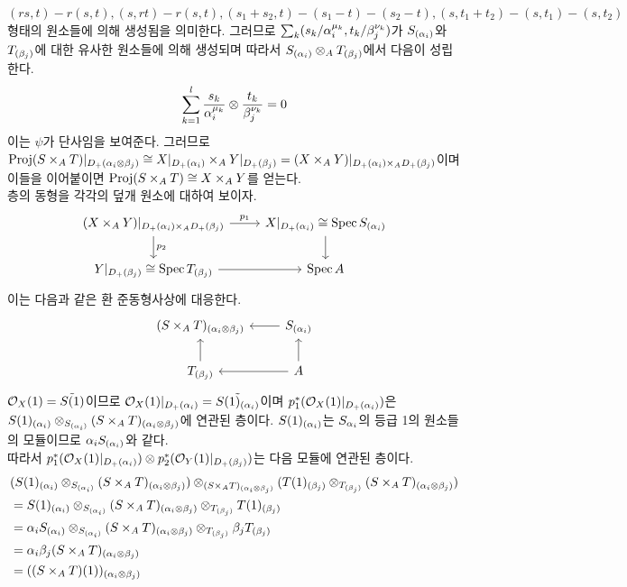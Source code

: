 \begin{enumerate}[label=\tb{5.\arabic*.},itemindent=0mm,itemsep=4mm]
	$(rs,t)-r(s,t),(s,rt)-r(s,t),(s_1+s_2,t)-(s_1-t)-(s_2-t),(s,t_1+t_2)-(s,t_1)-(s,t_2)$ 형태의 원소들에 의해 생성됨을 의미한다.
	그러므로 $\sum_k(s_k/\alpha_i^{\mu_k},t_k/\beta_j^{\nu_k})$가 $S_{(\alpha_i)}$와 $T_{(\beta_j)}$에 대한 유사한 원소들에 의해 생성되며
	따라서 $S_{(\alpha_i)}\otimes_AT_{(\beta_j)}$에서 다음이 성립한다.
	$$\sum_{k=1}^l\frac{s_k}{\alpha_i^{\mu_k}}\otimes\frac{t_k}{\beta_j^{\nu_k}}=0$$
	이는 $\psi$가 단사임을 보여준다. 그러므로 $\operatorname{Proj}(S\times_AT)|_{D_+(\alpha_i\otimes\beta_j)}\cong
	X|_{D_+(\alpha_i)}\times_AY|_{D_+(\beta_j)}=(X\times_AY)|_{D_+(\alpha_i)\times_AD_+(\beta_j)}$이며
	이들을 이어붙이면 $\operatorname{Proj}(S\times_AT)\cong X\times_AY$를 얻는다.\\
	층의 동형을 각각의 덮개 원소에 대하여 보이자.
	$$\begin{tikzcd}(X\times_AY)\rest_{D_+(\al_i)\times_AD_+(\be_j)}\arrow[r,"p_1"]\arrow[d,"p_2"]
	&X\rest_{D_+(\al_i)}\cong\Spec S_{(\al_i)}\arrow[d]\\
	Y\rest_{D_+(\be_j)}\cong\Spec T_{(\be_j)}\arrow[r]&\Spec A\end{tikzcd}$$
	이는 다음과 같은 환 준동형사상에 대응한다.
	$$\begin{tikzcd}(S\times_AT)_{(\al_i\otimes\be_j)}&S_{(\al_i)}\arrow[l]\\
	T_{(\be_j)}\arrow[u]&A\arrow[u]\arrow[l]\end{tikzcd}$$
	$\mathcal{O}_X(1)=\tilde{S(1)}$이므로 $\mathcal{O}_X(1)|_{D_+(\alpha_i)}=\tilde{S(1)_{(\alpha_i)}}$이며
	$p_1^*(\mathcal{O}_X(1)|_{D_+(\alpha_i)})$은
	$S(1)_{(\alpha_i)}\otimes_{S_{(\alpha_i)}}(S\times_AT)_{(\alpha_i\otimes\beta_j)}$에 연관된 층이다.
	$S(1)_{(\alpha_i)}$는 $S_{\alpha_i}$의 등급 1의 원소들의 모듈이므로 $\alpha_iS_{(\alpha_i)}$와 같다.\\
	따라서 $p_1^*(\mathcal{O}_X(1)|_{D_+(\alpha_i)})\otimes p_2^*(\mathcal{O}_Y(1)|_{D_+(\beta_j)})$는 다음 모듈에 연관된 층이다.
	\begin{align*}
	&(S(1)_{(\al_i)}\otimes_{S_{(\al_i)}}(S\times_AT)_{(\al_i\otimes\be_j)})\otimes_{(S\times_AT)_{(\al_i\otimes\be_j)}}
	(T(1)_{(\be_j)}\otimes_{T_{(\be_j)}}(S\times_AT)_{(\al_i\otimes\be_j)})\\
	&=S(1)_{(\al_i)}\otimes_{S_{(\al_i)}}(S\times_AT)_{(\al_i\otimes\be_j)}\otimes_{T_{(\be_j)}}T(1)_{(\be_j)}\\
	&=\al_iS_{(\al_i)}\otimes_{S_{(\al_i)}}(S\times_AT)_{(\al_i\otimes\be_j)}\otimes_{T_{(\be_j)}}\be_jT_{(\be_j)}\\
	&=\al_i\be_j(S\times_AT)_{(\al_i\otimes\be_j)}\\
	&=((S\times_AT)(1))_{(\al_i\otimes\be_j)}

\end{align*}
\end{enumerate}
